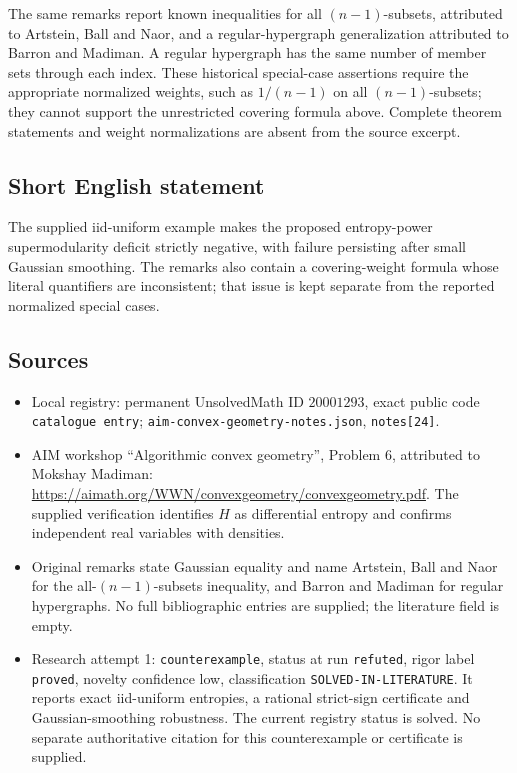 \documentclass[11pt]{article}
\begin{document}
The same remarks report known inequalities for all \((n-1)\)-subsets, attributed to Artstein, Ball and Naor, and a regular-hypergraph generalization attributed to Barron and Madiman. A regular hypergraph has the same number of member sets through each index. These historical special-case assertions require the appropriate normalized weights, such as \(1/(n-1)\) on all \((n-1)\)-subsets; they cannot support the unrestricted covering formula above. Complete theorem statements and weight normalizations are absent from the source excerpt.
\subsection{Short English statement}
The supplied iid-uniform example makes the proposed entropy-power supermodularity deficit strictly negative, with failure persisting after small Gaussian smoothing. The remarks also contain a covering-weight formula whose literal quantifiers are inconsistent; that issue is kept separate from the reported normalized special cases.
\subsection{Sources}
\begin{itemize}
\item Local registry: permanent UnsolvedMath ID \(20001293\), exact public code \texttt{catalogue entry}; \texttt{aim-convex-geometry-notes.json}, \texttt{notes[24]}.
\item AIM workshop ``Algorithmic convex geometry'', Problem 6, attributed to Mokshay Madiman: \url{https://aimath.org/WWN/convexgeometry/convexgeometry.pdf}. The supplied verification identifies \(H\) as differential entropy and confirms independent real variables with densities.
\item Original remarks state Gaussian equality and name Artstein, Ball and Naor for the all-\((n-1)\)-subsets inequality, and Barron and Madiman for regular hypergraphs. No full bibliographic entries are supplied; the literature field is empty.
\item Research attempt 1: \texttt{counterexample}, status at run \texttt{refuted}, rigor label \texttt{proved}, novelty confidence low, classification \texttt{SOLVED-IN-LITERATURE}. It reports exact iid-uniform entropies, a rational strict-sign certificate and Gaussian-smoothing robustness. The current registry status is solved. No separate authoritative citation for this counterexample or certificate is supplied.
\end{itemize}
\end{document}
